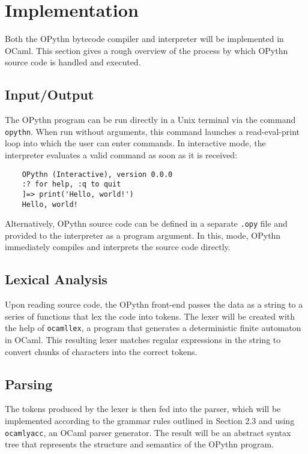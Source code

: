 \documentclass[11pt, twoside]{article}
\begin{document}
\section{Implementation}
Both the OPythn bytecode compiler and interpreter will be implemented in OCaml. This section gives a rough overview of the process by which OPythn source code is handled and executed.
    \subsection{Input/Output}
    The OPythn program can be run directly in a Unix terminal via the command \texttt{opythn}. When run without arguments, this command launches a read-eval-print loop into which the user can enter commands. In interactive mode, the interpreter evaluates a valid command as soon as it is received:
    \begin{lstlisting}
    OPythn (Interactive), version 0.0.0
    :? for help, :q to quit
    ]=> print('Hello, world!')
    Hello, world!
    \end{lstlisting}
    Alternatively, OPythn source code can be defined in a separate \texttt{.opy} file and provided to the interpreter as a program argument. In this, mode, OPythn immediately compiles and interprets the source code directly.
    \subsection{Lexical Analysis}
    Upon reading source code, the OPythn front-end passes the data as a string to a series of functions that lex the code into tokens. The lexer will be created with the help of \texttt{ocamllex}, a program that generates a deterministic finite automaton in OCaml. This resulting lexer matches regular expressions in the string to convert chunks of characters into the correct tokens. 
    \subsection{Parsing}
    The tokens produced by the lexer is then fed into the parser, which will be implemented according to the grammar rules outlined in Section 2.3 and using \texttt{ocamlyacc}, an OCaml parser generator. The result will be an abstract syntax tree that represents the structure and semantics of the OPythn program. 
\end{document}

